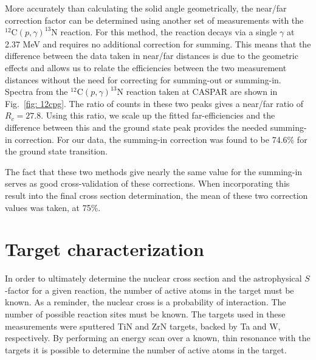 More accurately than calculating the solid angle geometrically, the near/far correction factor can be determined using another set of measurements with the $^{12}$C$\left( p,\gamma \right) ^{13}$N reaction. For this method, the reaction decays via a single $\gamma$ at 2.37 MeV and requires no additional correction for summing. This means that the difference between the data taken in near/far distances is due to the geometric effects and allows us to relate the efficiencies between the two measurement distances without the need for correcting for summing-out or summing-in. Spectra from the $^{12}$C$\left( p,\gamma \right) ^{13}$N reaction taken at CASPAR are shown in Fig.\ \ref{fig: 12cpg}. The ratio of counts in these two peaks gives a near/far ratio of $R_{c} = 27.8$. Using this ratio, we scale up the fitted far-efficiencies and the difference between this and the ground state peak provides the needed summing-in correction. For our data, the summing-in correction was found to be 74.6\% for the ground state transition. 



The fact that these two methods give nearly the same value for the summing-in serves as good cross-validation of these corrections. When incorporating this result into the final cross section determination, the mean of these two correction values was taken, at 75\%. 






\section{Target characterization}
\label{sec: targetCharacterization}

In order to ultimately determine the nuclear cross section and the astrophysical $S$-factor for a given reaction, the number of active atoms in the target must be known. As a reminder, the nuclear cross is a probability of interaction. The number of possible reaction sites must be known. The targets used in these measurements were sputtered TiN and ZrN targets, backed by Ta and W, respectively. By performing an energy scan over a known, thin resonance with the targets it is possible to determine the number of active atoms in the target. 

